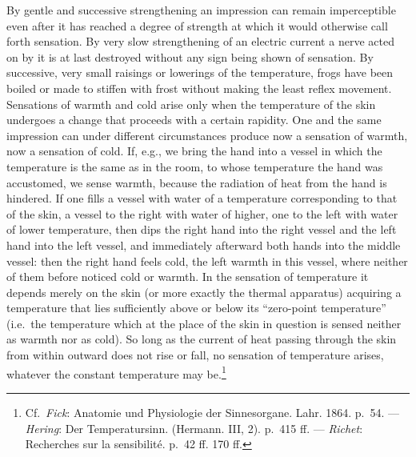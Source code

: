 \documentclass[12pt,a4paper]{book}
\newcommand{\opage}[1]{\marginnote{\footnotesize\textit{[#1]}}}
\begin{document}
By gentle and successive strengthening an impression can remain
imperceptible even after it has reached a degree of strength at which it
would otherwise call forth sensation. By very slow strengthening of an
electric current a nerve acted on by it is at last destroyed without
any sign being shown of
\opage{131}sensation. By successive, very small raisings or lowerings of
the temperature, frogs have been boiled or made to stiffen with frost
without making the least reflex movement. Sensations of warmth and cold
arise only when the temperature of the skin undergoes a change that
proceeds with a certain rapidity. One and the same impression can under
different circumstances produce now a sensation of warmth, now a
sensation of cold. If, e.g., we bring the hand into a vessel in which
the temperature is the same as in the room, to whose temperature the
hand was accustomed, we sense warmth, because the radiation of heat from
the hand is hindered. If one fills a vessel with water of a temperature
corresponding to that of the skin, a vessel to the right with water of
higher, one to the left with water of lower temperature, then dips the
right hand into the right vessel and the left hand into the left vessel,
and immediately afterward both hands into the middle vessel: then the
right hand feels cold, the left warmth in this vessel, where neither of
them before noticed cold or warmth. In the sensation of temperature it
depends merely on the skin (or more exactly the thermal apparatus)
acquiring a temperature that lies sufficiently above or below its
``zero-point temperature'' (i.e.\ the temperature which at the place of
the skin in question is sensed neither as warmth nor as cold). So long
as the current of heat passing through the skin from within outward does
not rise or fall, no sensation of temperature arises, whatever the
constant temperature may be.\footnote{Cf.\ \emph{Fick}: Anatomie und
Physiologie der Sinnesorgane. Lahr. 1864. p.~54. --- \emph{Hering}: Der
Temperatursinn. (Hermann. III, 2). p.~415 ff. --- \emph{Richet}:
Recherches sur la sensibilité. p.~42 ff. 170 ff.}
\end{document}
